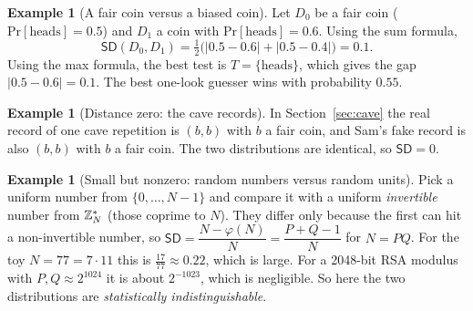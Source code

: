 \documentclass[11pt,a4paper]{report}
\theoremstyle{plain}
\theoremstyle{definition}
\newtheorem{example}[theorem]{Example}
\theoremstyle{remark}
\renewcommand{\Pr}{\mathrm{Pr}}
\newcommand{\SD}{\mathsf{SD}}
\newcommand{\Zs}[1]{\ZZ_{#1}^{*}}
\begin{document}
\begin{example}[A fair coin versus a biased coin]
Let $D_0$ be a fair coin ($\Pr[\text{heads}]=0.5$) and $D_1$ a coin with $\Pr[\text{heads}]=0.6$. Using the sum formula,
\[\SD(D_0,D_1)=\tfrac12\big(|0.5-0.6|+|0.5-0.4|\big)=0.1.\]
Using the max formula, the best test is $T=\{\text{heads}\}$, which gives the gap $|0.5-0.6|=0.1$. The best one-look guesser wins with probability $0.55$.
\end{example}

\begin{example}[Distance zero: the cave records]
In Section~\ref{sec:cave} the real record of one cave repetition is $(b,b)$ with $b$ a fair coin, and Sam's fake record is also $(b,b)$ with $b$ a fair coin. The two distributions are identical, so $\SD=0$.
\end{example}

\begin{example}[Small but nonzero: random numbers versus random units]\label{ex:sd-units}
Pick a uniform number from $\{0,\dots,N-1\}$ and compare it with a uniform \emph{invertible} number from $\Zs N$ (those coprime to $N$). They differ only because the first can hit a non-invertible number, so $\SD=\dfrac{N-\varphi(N)}{N}=\dfrac{P+Q-1}{N}$ for $N=PQ$.
For the toy $N=77=7\cdot11$ this is $\tfrac{17}{77}\approx0.22$, which is large. For a 2048-bit RSA modulus with $P,Q\approx2^{1024}$ it is about $2^{-1023}$, which is negligible. So here the two distributions are \emph{statistically indistinguishable}.
\end{example}
\end{document}
